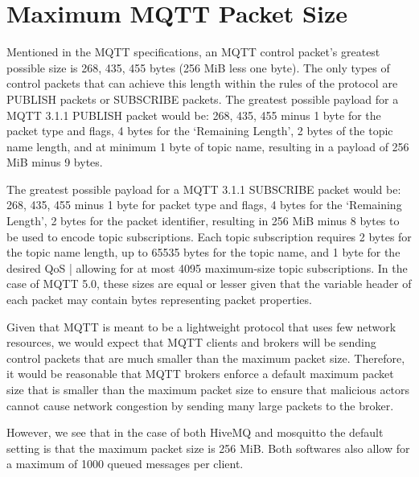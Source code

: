 \documentclass[12pt]{article}
\begin{document}
\section{Maximum MQTT Packet Size}
Mentioned in the MQTT specifications, an MQTT control packet's greatest possible size is 268, 435, 455 bytes (256 MiB less one byte). The only types of control packets that can achieve this length within the rules of the protocol are PUBLISH packets or SUBSCRIBE packets. The greatest possible payload for a MQTT 3.1.1 PUBLISH packet would be: 268, 435, 455 minus 1 byte for the packet type and flags, 4 bytes for the `Remaining Length', 2 bytes of the topic name length, and at minimum 1 byte of topic name, resulting in a payload of 256 MiB minus 9 bytes.\par
The greatest possible payload for a MQTT 3.1.1 SUBSCRIBE packet would be: 268, 435, 455 minus 1 byte for packet type and flags, 4 bytes for the `Remaining Length', 2 bytes for the packet identifier, resulting in 256 MiB minus 8 bytes to be used to encode topic subscriptions. Each topic subscription requires 2 bytes for the topic name length, up to 65535 bytes for the topic name, and 1 byte for the desired QoS | allowing for at most 4095 maximum-size topic subscriptions. In the case of MQTT 5.0, these sizes are equal or lesser given that the variable header of each packet may contain bytes representing packet properties.\par
Given that MQTT is meant to be a lightweight protocol that uses few network resources, we would expect that MQTT clients and brokers will be sending control packets that are much smaller than the maximum packet size. Therefore, it would be reasonable that MQTT brokers enforce a default maximum packet size that is smaller than the maximum packet size to ensure that malicious actors cannot cause network congestion by sending many large packets to the broker. \par
However, we see that in the case of both HiveMQ and mosquitto the default setting is that the maximum packet size is 256 MiB. Both softwares also allow for a maximum of 1000 queued messages per client. 
\end{document}
